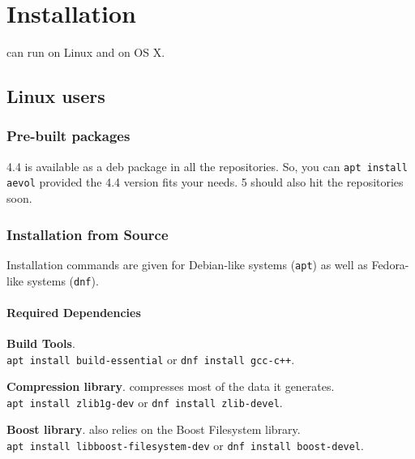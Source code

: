 \chapter{Installation}
\label{chap:install}

\newcommand{\macos}{OS X}

\vspace{5mm}

\aevol{} can run on Linux and on \macos{}.

\section{Linux users}
\label{sec:linux}

\subsection{Pre-built packages}
\aevol{} 4.4 is available as a deb package in all the
repositories. So, you can \verb?apt install aevol? provided the 4.4
version fits your needs. \aevol{} 5 should also hit the repositories
soon.

\subsection{Installation from Source}

Installation commands are given for Debian-like systems (\verb?apt?)
as well as Fedora-like systems (\verb?dnf?).

\subsubsection{Required Dependencies}
\begin{myList} 
\item \textbf{Build Tools}.\\
  \verb?apt install build-essential? or \verb?dnf install gcc-c++?.
\item \textbf{Compression library}.
  \aevol{} compresses most of the data it generates.\\
  \verb?apt install zlib1g-dev? or \verb?dnf install zlib-devel?.
\item \textbf{Boost library}.
  \aevol{} also relies on the Boost Filesystem library.\\
  \verb?apt install libboost-filesystem-dev? or \verb?dnf install boost-devel?.
\end{myList}

